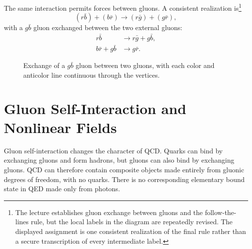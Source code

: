 The same interaction permits forces between gluons. A consistent realization is\footnote{The lecture establishes gluon exchange between gluons and the follow-the-lines rule, but the local labels in the diagram are repeatedly revised. The displayed assignment is one consistent realization of the final rule rather than a secure transcription of every intermediate label.}
\begin{equation}
(r\bar b)+(b\bar r)
\longrightarrow
(r\bar g)+(g\bar r),
\end{equation}
with a \(g\bar b\) gluon exchanged between the two external gluons:
\begin{align}
r\bar b&\longrightarrow r\bar g+g\bar b,\\
b\bar r+g\bar b&\longrightarrow g\bar r.
\end{align}

\begin{figure}[h]
\centering
{}
\caption{Exchange of a \(g\bar b\) gluon between two gluons, with each color and anticolor line continuous through the vertices.}
\end{figure}

\section{Gluon Self-Interaction and Nonlinear Fields}

Gluon self-interaction changes the character of QCD. Quarks can bind by exchanging gluons and form hadrons, but gluons can also bind by exchanging gluons. QCD can therefore contain composite objects made entirely from gluonic degrees of freedom, with no quarks. There is no corresponding elementary bound state in QED made only from photons.


